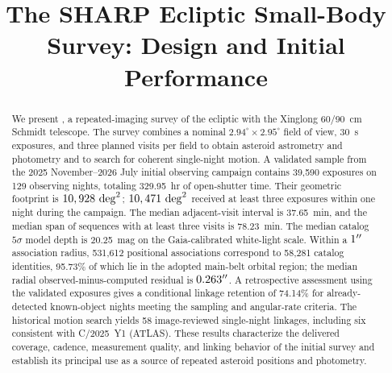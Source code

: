 \title{The SHARP Ecliptic Small-Body Survey: Design and Initial Performance}

\begin{abstract}
We present \SHARP, a repeated-imaging survey of the ecliptic with the Xinglong
60/90~cm Schmidt telescope. The survey combines a nominal
$2.94^\circ\times2.95^\circ$ field of view, 30~s exposures, and three planned
visits per field to obtain asteroid astrometry and photometry and to search
for coherent single-night motion. A validated sample from the 2025
November--2026 July initial observing campaign contains 39,590 exposures on 129
observing nights, totaling 329.95~hr of open-shutter time. Their geometric
footprint is $10,928~\mathrm{deg}^{2}$; $10,471~\mathrm{deg}^{2}$ received at least three exposures
within one night during the campaign. The median adjacent-visit interval is
37.65~min, and the median span of sequences with at least three visits is
78.23~min. The median catalog $5\sigma$ model depth is 20.25~mag on the
Gaia-calibrated white-light scale. Within a $1^{\prime\prime}$ association radius,
531,612 positional associations correspond to 58,281 catalog identities,
95.73\% of which lie in the adopted main-belt orbital region; the median
radial observed-minus-computed residual is $0.263^{\prime\prime}$. A retrospective
assessment using the validated exposures gives a conditional linkage
retention of 74.14\% for already-detected known-object nights meeting the
sampling and angular-rate criteria.
The historical motion search yields 58 image-reviewed single-night linkages,
including six consistent with C/2025~Y1 (ATLAS). These results characterize
the delivered coverage, cadence, measurement quality, and linking behavior
of the initial survey and establish its principal use as a source of
repeated asteroid positions and photometry.
\end{abstract}

